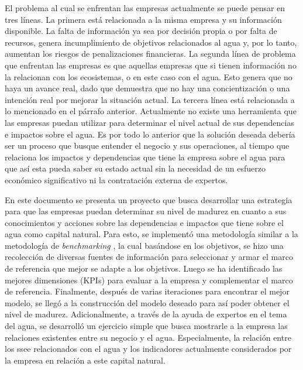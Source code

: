El problema al cual se enfrentan las empresas actualmente se puede pensar en tres líneas. La primera está relacionada a la misma empresa y su información disponible. La falta de información ya sea por decisión propia o por falta de recursos, genera incumplimiento de objetivos relacionados al agua y, por lo tanto, aumentan los riesgos de penalizaciones financieras. La segunda línea de problema que enfrentan las empresas es que aquellas empresas que si tienen información no la relacionan con los ecosistemas, o en este caso con el agua. Esto genera que no haya un avance real, dado que demuestra que no hay una concientización o una intención real por mejorar la situación actual. La tercera línea está relacionada a lo mencionado en el párrafo anterior. Actualmente no existe una herramienta que las empresas puedan utilizar para determinar el nivel actual de sus dependencias e impactos sobre el agua. Es por todo lo anterior que la solución deseada debería ser un proceso que busque entender el negocio y sus operaciones, al tiempo que relaciona los impactos y dependencias que tiene la empresa sobre el agua para que así esta pueda saber su estado actual sin la necesidad de un esfuerzo económico significativo ni la contratación externa de expertos.

\hfill

En este documento se presenta un proyecto que busca desarrollar una estrategia para que las empresas puedan determinar su nivel de madurez en cuanto a sus conocimientos y acciones sobre las dependencias e impactos que tiene sobre el agua como capital natural. Para esto, se implementó una metodología similar a la metodología de \textit{benchmarking} \parencite{how-to-build-a-benchmark}, la cual basándose en los objetivos, se hizo una recolección de diversas fuentes de información para seleccionar y armar el marco de referencia que mejor se adapte a los objetivos. Luego se ha identificado las mejores dimensiones (KPIs) para evaluar a la empresa y complementar el marco de referencia. Finalmente, después de varias iteraciones para encontrar el mejor modelo, se llegó a la construcción del modelo deseado para así poder obtener el nivel de madurez.  Adicionalmente, a través de la ayuda de expertos en el tema del agua, se desarrolló un ejercicio simple que busca mostrarle a la empresa las relaciones existentes entre su negocio y el agua. Especialmente, la relación entre los \acrfull{ssee} relacionados con el agua y los indicadores actualmente considerados por la empresa en relación a este capital natural. 

